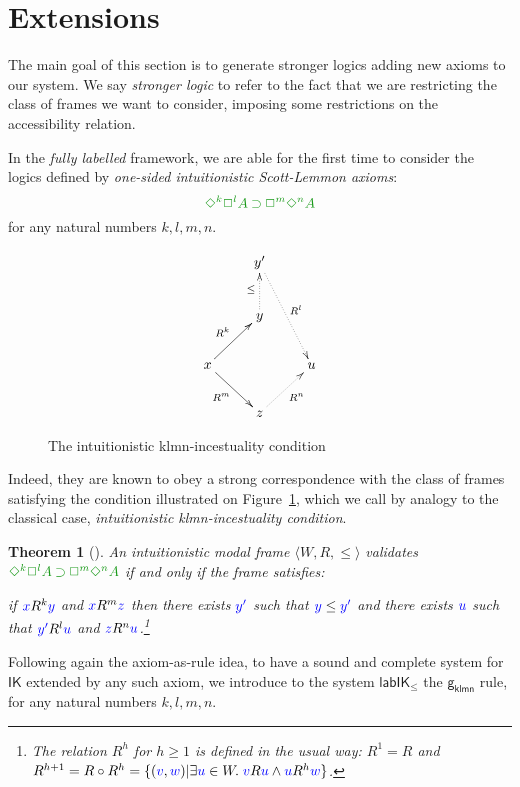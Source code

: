 \documentclass[a4paper]{article}
\theoremstyle{plain}
\newtheorem{theorem}{Theorem}[section]
\theoremstyle{definition}
\newcommand{\set}[1]{\{#1\}}
\newcommand*{\IK}{\mathsf{IK}}
\newcommand*{\labIKp}{\lab\IK_{\le}}
\newcommand*{\IMP}{\mathbin{\supset}}%
\newcommand*{\BOX}{\mathord{\Box}}
\newcommand*{\DIA}{\mathord{\Diamond}}
\newcommand*{\fm}[1]{{\color{notgreen}{#1}}}
\newcommand*{\lb}[1]{{\color{blue}{#1}}}
\newcommand*{\rel}{R}
\newcommand*{\futs}[2]{\lb{#1}\le{\lb{#2}}}
\newcommand*{\lab}{\mathsf{lab}}
\newcommand{\gklmn}{{\mathsf{g_{klmn}}}}%
\begin{document}
\section{Extensions}\label{sec:ext}

The main goal of this section is to generate stronger logics adding new axioms to our system. We say \emph{stronger logic} to refer to the fact that we are restricting the class of frames we want to consider, imposing some restrictions on the accessibility relation. 

In the \emph{fully labelled} framework, we are able for the first time to consider the logics defined by \emph{one-sided intuitionistic Scott-Lemmon axioms}:
\begin{equation}
\fm{\DIA^{k} \BOX^{l} A \IMP \BOX^{m}\DIA^{n} A}
\end{equation}
for any natural numbers $k,l,m,n$.

\begin{figure}
	$$
	\xymatrix{
		& y' \ar@{.>}[ddr]^{R^l} \\
		& y \ar@{.>}[u]^{\le} \\
		x \ar@{->}[ur]^{R^k}\ar@{->}[dr]_{R^m} && u \\
		& z \ar@{.>}[ur]_{R^n}
	}
	$$
	\caption{The intuitionistic klmn-incestuality condition}
	\label{fig:gklmn}
\end{figure}

Indeed, they are known to obey a strong correspondence with the class of frames satisfying the condition illustrated on Figure~\ref{fig:gklmn}, which we call by analogy to the classical case, \emph{intuitionistic klmn-incestuality condition}.

\begin{theorem}[\cite{plotkin:stirling:86}]\label{thm:gklmn-correspondence}
	An intuitionistic modal frame $\langle W, \rel, \le \rangle$ validates $\fm{\DIA^k\BOX^l A \IMP \BOX^m\DIA^n A}$ if and only if the frame satisfies:
	
	if $\lb x R^{k} \lb y$ and $\lb x R^{m} \lb z$ then there exists $\lb{y'}$ such that $\futs{y}{y'}$ and there exists $\lb u$ such that $\lb{y'}R^{l}\lb u$ and $\lb z R^{n} \lb u$.\footnote{The relation $R^h$ for $h\ge1$ is defined in the usual way: $R^1=R$ and $R^{h+1}=R\circ R^h=\set{(\lb v,\lb w)|\exists \lb u\in W.\; \lb vR\lb u \wedge \lb uR^h\lb w}$.}
\end{theorem}

Following again the axiom-as-rule idea, to have a sound and complete system for $\IK$ extended by any such axiom, we introduce to the system $\labIKp$ the $\gklmn$ rule, for any natural numbers $k,l,m,n$.
\end{document}
